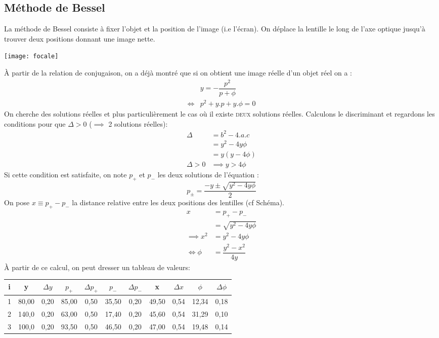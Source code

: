 \documentclass[12pt,a4paper]{article}
\begin{document}
	\subsection{Méthode de Bessel}
	La méthode de Bessel consiste à fixer l'objet et la position de l'image (i.e l'écran). On déplace la lentille le long de l'axe optique jusqu'à trouver deux positions donnant une image nette.
	\begin{center}
		\texttt{[image: focale]}
	\end{center}
	À partir de la relation de conjugaison, on a déjà montré que si on obtient une image réelle d'un objet réel on a : 
	\begin{align*}
	&y=-\dfrac{p^2}{p+\phi}\\
	\iff &p^2 + y.p + y.\phi=0
	\end{align*}
	On cherche des solutions réelles et plus particulièrement le cas où il existe \textsc{deux} solutions réelles. Calculons le discriminant et regardons les conditions pour que $\Delta>0$ ($\implies$ 2 solutions réelles): 
	\begin{align*}
	\Delta &= b^2-4.a.c \\
	&= y^2-4y\phi\\
	&=y(y-4\phi)\\[1em]
	\Delta>0&\implies y>4\phi
	\end{align*}
	Si cette condition est satisfaite, on note $p_+$ et $p_-$ les deux solutions de l'équation :
	$$p_{\pm}=\dfrac{-y\pm\sqrt{y^2-4y\phi}}{2}$$
	On pose $x\equiv p_+ - p_-$ la distance relative entre les deux positions des lentilles (cf Schéma).
	\begin{align*}
	x&=p_+ - p_-\\
	&=\sqrt{y^2-4y\phi}\\
	\implies x^2 &= y^2-4y\phi\\[1em]
	\iff \phi &= \dfrac{y^2-x^2}{4y}
	\end{align*}
	À partir de ce calcul, on peut dresser un tableau de valeurs:
	\begin{center}
		\begin{tabular}{|c|c|c|c|c|c|c|c|c|c|c|}
			\hline
			i & y & $\Delta y$ & $p_+$ & $\Delta p_+$ & $p_-$ & $\Delta p_-$ & x & $\Delta x$ & $\phi$ & $\Delta\phi$\\
			\hline
			1 & 80,00 & 0,20 & 85,00 & 0,50 & 35,50 & 0,20 & 49,50 & 0,54 & 12,34 & 0,18\\
			\hline
			2 & 140,0 & 0,20 & 63,00 & 0,50 & 17,40 & 0,20 & 45,60 & 0,54 & 31,29 & 0,10\\
			\hline
			3 & 100,0 & 0,20 & 93,50 & 0,50 & 46,50 & 0,20 & 47,00 & 0,54 & 19,48 & 0,14\\
			\hline
		\end{tabular}
	\end{center}
\end{document}
